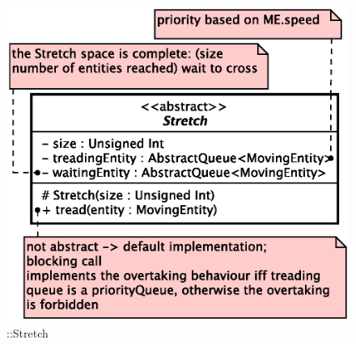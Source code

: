 \begin{figure}[h]
\centering
\includegraphics[scale=0.6,keepaspectratio]{images/solution/app/backend/stretch.eps}
\caption{\pReactiveComponentStretch::Stretch}
\label{fig:sd-app-stretch}
\end{figure}
\FloatBarrier
